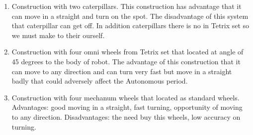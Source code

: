 \begin{enumerate}
\begin{enumerate}
\begin{enumerate}
\begin{enumerate}
	      \item Construction with two caterpillars. This construction has advantage that it can move in a straight and turn on the spot. The disadvantage of this system that caterpillar can get off. In addition caterpillars there is no in Tetrix set so we must make to their ourself.  
	      
	      \item Construction with four omni wheels from Tetrix set that located at angle of 45 degrees to the body of robot. The advantage of this construction that it can move to any direction and can turn very fast but move in a straight badly that could adversely affect the Autonomous period.
	      
	      \item Construction with four mechanum wheels that located as standard wheels. Advantages: good moving in a straight, fast turning, opportunity of moving to any direction. Disadvantages: the need buy this wheels, low accuracy on turning.
	      

\end{enumerate}
\end{enumerate}
\end{enumerate}
\end{enumerate}

